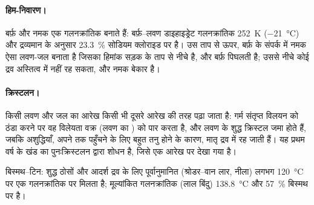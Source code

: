 \paragraph{हिम-निवारण।} बर्फ़ और नमक एक गलनक्रांतिक बनाते हैं: बर्फ़--लवण डाइहाइड्रेट
गलनक्रांतिक \qty{252}{K} (\qty{-21}{\degreeCelsius}) और द्रव्यमान के अनुसार 23.3~\% सोडियम
क्लोराइड पर है। उस ताप से ऊपर, बर्फ़ के संपर्क में नमक ऐसा
लवण-जल बनाता है जिसका हिमांक सड़क के ताप से नीचे है, और बर्फ़
पिघलती है; उससे नीचे कोई द्रव अस्तित्व में नहीं रह सकता, और नमक बेकार है।

\paragraph{क्रिस्टलन।} किसी लवण और जल का आरेख किसी भी दूसरे आरेख की तरह
पढ़ा जाता है: गर्म संतृप्त विलयन को ठंडा करने पर वह विलेयता वक्र (लवण का
) को पार करता है, और लवण के शुद्ध क्रिस्टल जमा होते हैं, जबकि
अशुद्धियाँ, अपने  तक पहुँचने के लिए बहुत तनु होने के कारण, मातृ द्रव में रह जाती हैं।
यह प्रथम वर्ष के खंड का पुनःक्रिस्टलन द्वारा शोधन है, जिसे एक
आरेख पर देखा गया है।

\begin{omfigure}

{\small बिस्मथ--टिन: शुद्ध ठोसों और आदर्श द्रव के लिए पूर्वानुमानित 
(श्रोडर--वान लार, नीला) लगभग \qty{120}{\degreeCelsius} पर एक गलनक्रांतिक पर
मिलता है; मूल्यांकित गलनक्रांतिक (लाल बिंदु)
\qty{138.8}{\degreeCelsius} और 57~\% बिस्मथ पर है।}
\end{omfigure}

